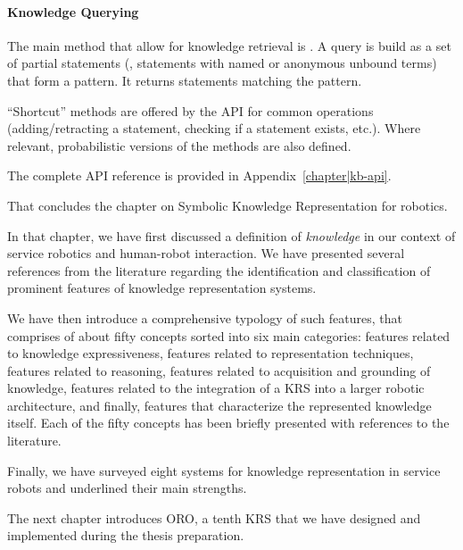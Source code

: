 \paragraph{Knowledge Querying} The main method that allow for knowledge
retrieval is . A  query is build as a set of partial
statements (\ie, statements with named or anonymous unbound terms) that form a
pattern. It returns statements matching the pattern.

``Shortcut'' methods are offered by the API for common operations
(adding/retracting a statement, checking if a statement exists, etc.). Where
relevant, probabilistic versions of the methods are also defined.

The complete API reference is provided in Appendix~\ref{chapter|kb-api}.


\recap

That concludes the chapter on Symbolic Knowledge Representation for robotics.

In that chapter, we have first discussed a definition of \emph{knowledge} in
our context of service robotics and human-robot interaction. We have presented
several references from the literature regarding the identification and
classification of prominent features of knowledge representation systems. 

We have then introduce a comprehensive typology of such features, that
comprises of about fifty concepts sorted into six main categories: features
related to knowledge expressiveness, features related to representation
techniques, features related to reasoning, features related to acquisition and
grounding of knowledge, features related to the integration of a KRS into a
larger robotic architecture, and finally, features that characterize the
represented knowledge itself. Each of the fifty concepts has been briefly
presented with references to the literature.

Finally, we have surveyed eight systems for knowledge representation in service
robots and underlined their main strengths.

The next chapter introduces ORO, a tenth KRS that we have designed and
implemented during the thesis preparation.

